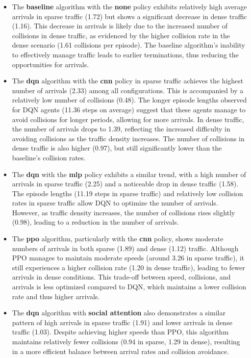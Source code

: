 \begin{itemize}
    \item The \textbf{baseline} algorithm with the \textbf{none} policy exhibits relatively high average arrivals in sparse traffic (1.72) but shows a significant decrease in dense traffic (1.16). This decrease in arrivals is likely due to the increased number of collisions in dense traffic, as evidenced by the higher collision rate in the dense scenario (1.61 collisions per episode). The baseline algorithm's inability to effectively manage traffic leads to earlier terminations, thus reducing the opportunities for arrivals.
    \item The \textbf{dqn} algorithm with the \textbf{cnn} policy in sparse traffic achieves the highest number of arrivals (2.33) among all configurations. This is accompanied by a relatively low number of collisions (0.48). The longer episode lengths observed for DQN agents (11.36 steps on average) suggest that these agents manage to avoid collisions for longer periods, allowing for more arrivals. In dense traffic, the number of arrivals drops to 1.39, reflecting the increased difficulty in avoiding collisions as the traffic density increases. The number of collisions in dense traffic is also higher (0.97), but still significantly lower than the baseline's collision rates.
    \item The \textbf{dqn} with the \textbf{mlp} policy exhibits a similar trend, with a high number of arrivals in sparse traffic (2.25) and a noticeable drop in dense traffic (1.58). The episode lengths (11.19 steps in sparse traffic) and relatively low collision rates in sparse traffic allow DQN to optimize the number of arrivals. However, as traffic density increases, the number of collisions rises slightly (0.98), leading to a reduction in the number of arrivals.
    \item The \textbf{ppo} algorithm, particularly with the \textbf{cnn} policy, shows moderate numbers of arrivals in both sparse (1.89) and dense (1.12) traffic. Although PPO manages to maintain moderate speeds (around 3.26 in sparse traffic), it still experiences a higher collision rate (1.20 in dense traffic), leading to fewer arrivals in dense conditions. This trade-off between speed, collisions, and arrivals is less optimized compared to DQN, which maintains a lower collision rate and thus higher arrivals.
    \item The \textbf{dqn} algorithm with \textbf{social attention} also demonstrates a similar pattern of high arrivals in sparse traffic (1.91) and lower arrivals in dense traffic (1.03). Despite achieving higher speeds than PPO, this algorithm maintains relatively fewer collisions (0.94 in sparse, 1.29 in dense), resulting in a more efficient balance between arrival rates and collision avoidance.
\end{itemize}

